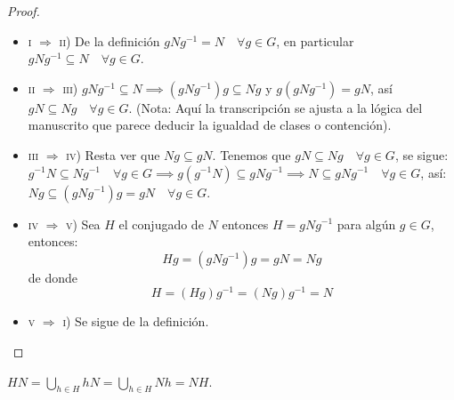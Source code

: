 \begin{proof}

	\begin{itemize}
		\item \textsc{i} $\Rightarrow$ \textsc{ii}) De la definición $gNg^{-1} = N \quad \forall g \in G$, en particular $gNg^{-1} \subseteq N \quad \forall g \in G$.
		\item \textsc{ii} $\Rightarrow$ \textsc{iii}) $gNg^{-1} \subseteq N \implies (gNg^{-1})g \subseteq Ng$ y $g(gNg^{-1}) = gN$, así $gN \subseteq Ng \quad \forall g \in G$.
		      (Nota: Aquí la transcripción se ajusta a la lógica del manuscrito que parece deducir la igualdad de clases o contención).
		\item \textsc{iii} $\Rightarrow$ \textsc{iv}) Resta ver que $Ng \subseteq gN$. Tenemos que $gN \subseteq Ng \quad \forall g \in G$, se sigue:
		      $g^{-1}N \subseteq Ng^{-1} \quad \forall g \in G \implies g(g^{-1}N) \subseteq gNg^{-1} \implies N \subseteq gNg^{-1} \quad \forall g \in G$, así:
		      $Ng \subseteq (gNg^{-1})g = gN \quad \forall g \in G$.
		\item \textsc{iv} $\Rightarrow$ \textsc{v}) Sea $H$ el conjugado de $N$ entonces $H = gNg^{-1}$ para algún $g \in G$, entonces:
		      \begin{equation*}
			      Hg = (gNg^{-1})g = gN = Ng
		      \end{equation*}
		      de donde
		      \begin{equation*}
			      H = (Hg)g^{-1} = (Ng)g^{-1} = N
		      \end{equation*}
		\item \textsc{v} $\Rightarrow$ \textsc{i}) Se sigue de la definición.
	\end{itemize}

\end{proof}


\begin{enefecto}
	$HN = \bigcup_{h \in H} hN = \bigcup_{h \in H} Nh = NH$.
\end{enefecto}


